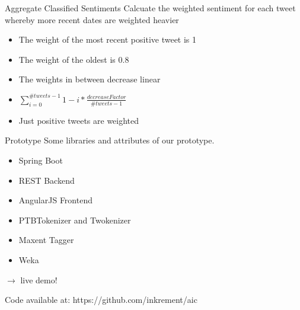 \documentclass{beamer}
\begin{document}
\begin{frame}{Aggregate Classified Sentiments}
Calcuate the weighted sentiment for each tweet whereby more recent dates are weighted heavier
\begin{itemize}
	\item The weight of the most recent positive tweet is 1
    \item The weight of the oldest is 0.8
    \item The weights in between decrease linear
    \item $\sum_{i = 0}^{\#tweets-1}1-i*\frac{decreaseFactor}{\#tweets-1}$
    \item Just positive tweets are weighted
\end{itemize}
\end{frame}


\begin{frame}{Prototype}
Some libraries and attributes of our prototype.

\begin{itemize}
	\item Spring Boot
    \item REST Backend
    \item AngularJS Frontend
    \item PTBTokenizer and Twokenizer
    \item Maxent Tagger
    \item Weka
\end{itemize}

\begin{block}{}
$\rightarrow$ live demo!
\end{block}

\begin{block}{}
Code available at: https://github.com/inkrement/aic
\end{block}

\end{frame}
\end{document}
